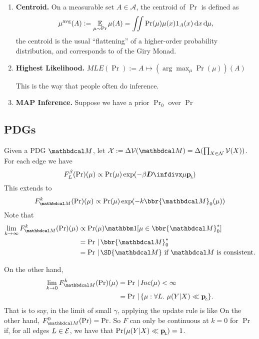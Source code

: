 \documentclass{article}
\begin{document}
\begin{enumerate}
    \item \textbf{Centroid.}
        On a measurable set $A \in \mathcal A$, the centroid of $\Pr$ is defined as
        \[
            \mu^{\text{avg}}(A) := \operatorname*{\mathbb{E}}_{\mu \sim \Pr} \mu(A) =
                \iint \Pr(\mu) \mu(x) 1_{A}(x)\, \mathrm d x\,\mathrm d\mu,
        \]
        the centroid is the usual ``flattening'' of a higher-order probability distribution, and corresponds to
        of the Giry Monad.

    \item \textbf{Highest Likelihood.}
        $\textit{MLE}(\Pr) := A \mapsto (\arg\max_\mu \Pr(\mu))(A)$

        This is the way that people often do inference.

    \item \textbf{MAP Inference.}
        Suppose we have a prior $\Pr_0$ over  $\Pr$

\end{enumerate}


\subsection{PDGs}

Given a PDG $\dg M$, let $\X := \Delta\V(\dg M) = \Delta(\prod_{X\in\N}\V(X))$. For each edge we have
\[
    F_L^{\beta}(\Pr) (\mu) \propto \Pr(\mu) \exp(-\beta \kldiv\mu \bp)
\]
This extends to
\[
    F_{\dg M}^k(\Pr)(\mu) \propto \Pr(\mu) \exp(- k \bbr{\dg M}_0(\mu))
\]
Note that
\begin{align*}
    \lim_{k \to \infty} F_{\dg M}^k(\Pr)(\mu) &\propto
        \Pr(\mu) \mathbbm1[\mu \in {\bbr{\dg M}^*_0}] \\
        &= \Pr \,|\, \bbr{\dg M}^*_0 \\
        &= \Pr \,|\, \SD{\dg M} \text{~if $\dg M$ is consistent.}
\end{align*}

On the other hand,
\begin{align*}
    \lim_{k \to 0} F_{\dg M}^k(\Pr)(\mu) &= \Pr \,|\, \Inc(\mu) < \infty \\
        &= \Pr \,|\, \{\mu : \forall L.~\mu(Y|X) \ll \bp \}.
\end{align*}
That is to say, in the limit of small $\gamma$, applying the update rule is like 
On the other hand, $F_{\dg M}^0(\Pr) = \Pr$. So $F$ can only be continuous at $k=0$ for $\Pr$ if, for all edges $L \in \mathcal E$, we have that $\Pr(\mu(Y|X) \ll \mathbf{p}_{\!_{L}\!}) = 1$.
\end{document}
